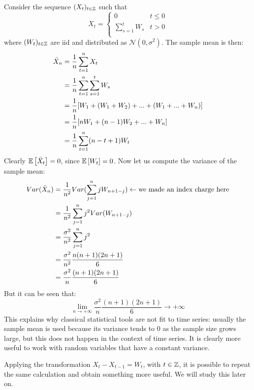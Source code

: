 \begin{example}
    Consider the sequence $(X_t)_{t\in\mathbb{Z}}$ such that
    \begin{equation*}
        X_t=
        \begin{cases}
            0 & t \le 0\\
            \sum_{s=1}^{t}W_s &  t>0\\
        \end{cases} 
    \end{equation*}
    where $(W_t)_{t\in\mathbb{Z}}$ are iid and distributed as $\mathcal{N}(0, \sigma^2)$. The sample mean is then:
    \begin{equation*}
        \begin{split}
            \bar{X}_n &= \frac{1}{n}\sum_{t=1}^{n}X_t\\
            &= \frac{1}{n}\sum_{t=1}^{n}\sum_{s=1}^{t}W_s\\
            &= \frac{1}{n}[W_1 + (W_1+W_2) + ... + (W_1+...+W_n)]\\
            &= \frac{1}{n}[nW_1 + (n-1)W_2 + ... + W_n]\\
            &= \frac{1}{n}\sum_{t=1}^{n}(n-t+1)W_t
        \end{split}
    \end{equation*}
    Clearly $\mathbb{E}\left[\bar{X}_t\right]=0$, since $\mathbb{E}\left[W_t\right]=0$. Now let us compute the variance of the sample mean:
    \begin{equation*}
        \begin{split}
            Var({\bar{X}}_n) &= \frac{1}{n^2}Var(\sum_{j=1}^{n}jW_{n+1-j}) \leftarrow \text{we made an index charge here}\\
            &= \frac{1}{n^2}\sum_{j=1}^{n}j^2Var(W_{n+1-j})\\
            &= \frac{\sigma^2}{n^2}\sum_{j=1}^{n}j^2\\
            &= \frac{\sigma^2}{n^2} \frac{n(n+1)(2n+1)}{6}\\
            &= \frac{\sigma^2}{n} \frac{(n+1)(2n+1)}{6}
        \end{split}
    \end{equation*}
    But it can be seen that:
    \[
        \lim_{n\to+\infty}\frac{\sigma^2}{n} \frac{(n+1)(2n+1)}{6} \rightarrow +\infty
    \]
    This explains why classical statistical tools are not fit to time series: usually the sample mean is used because its variance tends to 0 as the sample size grows large, but this does not happen in the context of time series. It is clearly more useful to work with random variables that have a constant variance.
    \begin{remark}
        Applying the transformation $X_t-X_{t-1} = W_t$, with $t\in\mathbb{Z}$, it is possible to repeat the same calculation and obtain something more useful. We will study this later on.
    \end{remark}
\end{example}

